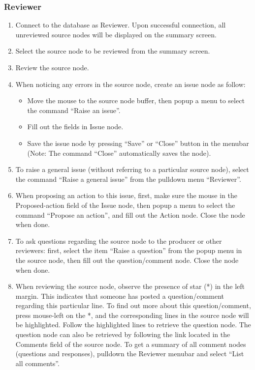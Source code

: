 \subsubsection*{Reviewer}
\begin{enumerate}
\item Connect to the database as Reviewer. Upon successful connection,
all unreviewed source nodes will be displayed on the summary screen.
\item Select the source node to be reviewed from the summary screen.
\item Review the source node.
\item When noticing any errors in the source node, create an issue
  node as follow:
  \begin{itemize}
    \item Move the mouse to the source node buffer, then
   popup a menu to select the command ``Raise an issue''.
    \item  Fill out the fields in Issue node.
    \item Save the issue node by pressing  ``Save'' or ``Close''
    button in the   menubar (Note: The command ``Close'' automatically
    saves the node). 
  \end{itemize}
\item To raise a general issue (without referring to a particular
source node), select the command ``Raise a general issue'' from the
pulldown menu ``Reviewer''.
\item When proposing an action to this issue, first, make sure the
mouse in the Proposed-action field of the Issue node, then popup a
menu to select the command ``Propose an action'', and fill out the
Action node. Close the node when done.
\item To ask questions regarding the source node to the producer or
other reviewers: first, select the item ``Raise a question'' from the
popup menu in the source 
node, then fill out the question/comment node. Close the node when done.
\item When reviewing the source node, observe the presence of
star (*) in the left margin. This indicates that someone has posted
a question/comment regarding this particular line. To find out more
about this question/comment, press mouse-left on the *, and the
corresponding lines in 
the source node will be highlighted. Follow the highlighted lines to
retrieve the question node.
The question node can also be retrieved by following the link located
in the Comments field of the source node.
To get a summary of all comment nodes (questions and responses),
pulldown the Reviewer menubar and select ``List all comments''.


\end{enumerate}
